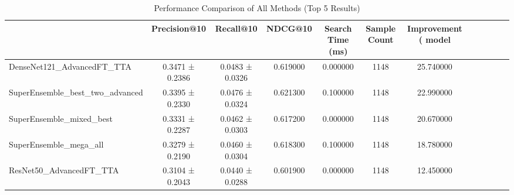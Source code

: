 \begin{table}
\caption{Performance Comparison of All Methods (Top 5 Results)}
\label{tab:final_performance}
\begin{tabular}{lcccccc}
\toprule
 & Precision@10 & Recall@10 & NDCG@10 & Search Time (ms) & Sample Count & Improvement (%
model &  &  &  &  &  &  \\
\midrule
DenseNet121_AdvancedFT_TTA & 0.3471 ± 0.2386 & 0.0483 ± 0.0326 & 0.619000 & 0.000000 & 1148 & 25.740000 \\
SuperEnsemble_best_two_advanced & 0.3395 ± 0.2330 & 0.0476 ± 0.0324 & 0.621300 & 0.100000 & 1148 & 22.990000 \\
SuperEnsemble_mixed_best & 0.3331 ± 0.2287 & 0.0462 ± 0.0303 & 0.617200 & 0.000000 & 1148 & 20.670000 \\
SuperEnsemble_mega_all & 0.3279 ± 0.2190 & 0.0460 ± 0.0304 & 0.618300 & 0.100000 & 1148 & 18.780000 \\
ResNet50_AdvancedFT_TTA & 0.3104 ± 0.2043 & 0.0440 ± 0.0288 & 0.601900 & 0.000000 & 1148 & 12.450000 \\
\bottomrule
\end{tabular}
\end{table}
